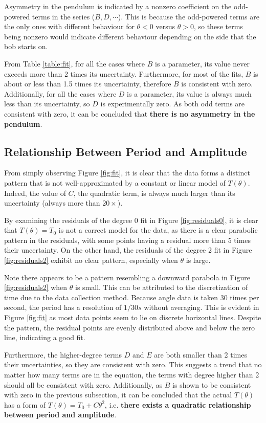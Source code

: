 \documentclass[aps,twocolumn,secnumarabic,nobalancelastpage,amsmath,amssymb,nofootinbib,floatfix]{revtex4}
\begin{document}
Asymmetry in the pendulum is indicated by a nonzero coefficient on the odd-powered terms in the series ($B, D, \cdots$).
This is because the odd-powered terms are the only ones with different behaviour for $\theta < 0$ versus $\theta > 0$,
so these terms being nonzero would indicate different behaviour depending on the side that the bob starts on.

From Table \ref{table:fit}, for all the cases where $B$ is a parameter, its value never exceeds more than 2 times its
uncertainty. Furthermore, for most of the fits, $B$ is about or less than 1.5 times its uncertainty, therefore
\(B\) is consistent with zero. Additionally, for all the cases where $D$ is a parameter, its value is always much less
than its uncertainty, so \(D\) is experimentally zero. As both odd terms are consistent with zero, it can be
concluded that \textbf{there is no asymmetry in the pendulum}.

\subsection{Relationship Between Period and Amplitude}

From simply observing Figure \ref{fig:fit}, it is clear that the data forms a distinct pattern that is not
well-approximated by a constant or linear model of $T(\theta)$. Indeed, the value of $C$, the quadratic term, is always
much larger than its uncertainty (always more than $20 \times$).

By examining the residuals of the degree 0 fit in Figure \ref{fig:residuals0}, it is clear that \(T(\theta) = T_0\) is
not a correct model for the data, as there is a clear parabolic pattern in the residuals, with some points having a
residual more than 5 times their uncertainty. On the other hand, the residuals of the degree 2 fit in Figure
\ref{fig:residuals2} exhibit no clear pattern, especially when \(\theta\) is large.

Note there appears to be a pattern resembling a downward parabola in Figure \ref{fig:residuals2} when \(\theta\) is small.
This can be attributed to the discretization of time due to the data collection method. Because angle data is taken 30
times per second, the period has a resolution of \(1/30\si{s}\) without averaging. This is evident in Figure
\ref{fig:fit} as most data points seem to lie on discrete horizontal lines. Despite the pattern, the residual points are
evenly distributed above and below the zero line, indicating a good fit.

Furthermore, the higher-degree terms $D$ and $E$ are both smaller than 2 times their uncertainties, so they are
consistent with zero. This suggests a trend that no matter how many terms are in the equation, the terms with degree
higher than 2 should all be consistent with zero. Additionally, as $B$ is shown to be consistent with zero in the
previous subsection, it can be concluded that the actual $T(\theta)$ has a form of $T(\theta) = T_0 + C\theta^2$, i.e.
\textbf{there exists a quadratic relationship between period and amplitude}.
\end{document}
